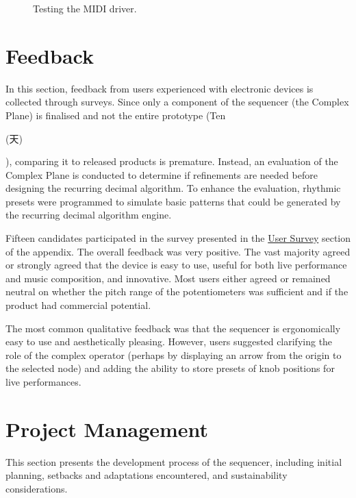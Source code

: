 \documentclass[12pt]{article}
\numberwithin{subsubsubsection}{subsubsection}
\begin{document}
\begin{figure}[H]
    \centering
    \caption{Testing the MIDI driver.}
    \label{fig:MIDI_test}
\end{figure}

\newpage

\section{Feedback}

In this section, feedback from users experienced with electronic devices is collected through surveys. Since only a component of the sequencer (the Complex Plane) is finalised and not the entire prototype (Ten\begin{CJK}{UTF8}{min}(天)\end{CJK}), comparing it to released products is premature. Instead, an evaluation of the Complex Plane is conducted to determine if refinements are needed before designing the recurring decimal algorithm. To enhance the evaluation, rhythmic presets were programmed to simulate basic patterns that could be generated by the recurring decimal algorithm engine.

Fifteen candidates participated in the survey presented in the \hyperref[appendix:survey]{User Survey} section of the appendix. The overall feedback was very positive. The vast majority agreed or strongly agreed that the device is easy to use, useful for both live performance and music composition, and innovative. Most users either agreed or remained neutral on whether the pitch range of the potentiometers was sufficient and if the product had commercial potential.

The most common qualitative feedback was that the sequencer is ergonomically easy to use and aesthetically pleasing. However, users suggested clarifying the role of the complex operator (perhaps by displaying an arrow from the origin to the selected node) and adding the ability to store presets of knob positions for live performances.






\newpage


\section{Project Management}

This section presents the development process of the sequencer, including initial planning, setbacks and adaptations encountered, and sustainability considerations.
\end{document}
